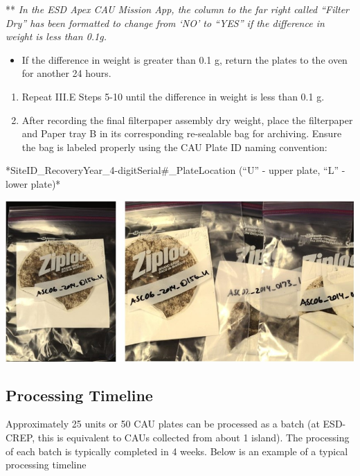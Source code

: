 \documentclass[]{book}
\providecommand{\tightlist}{%
  \setlength{\itemsep}{0pt}\setlength{\parskip}{0pt}}
\begin{document}
** \emph{In the ESD Apex CAU Mission App, the column to the far right called ``Filter Dry'' has been formatted to change from `NO' to ``YES'' if the difference in weight is less than 0.1g.}

\begin{itemize}
\tightlist
\item
  If the difference in weight is greater than 0.1 g, return the plates to the oven for another 24 hours.
\end{itemize}

\begin{enumerate}
\def\labelenumi{\arabic{enumi}.}
\setcounter{enumi}{10}
\item
  Repeat III.E Steps 5-10 until the difference in weight is less than 0.1 g.
\item
  After recording the final filterpaper assembly dry weight, place the filterpaper and Paper tray B in its corresponding re-sealable bag for archiving. Ensure the bag is labeled properly using the CAU Plate ID naming convention:
\end{enumerate}

*SiteID\_RecoveryYear\_4-digitSerial\#\_PlateLocation (``U'' - upper plate, ``L'' - lower plate)*

\includegraphics{images/CAU_bag.jpg}

\hypertarget{processing-timeline}{%
\subsection{Processing Timeline}\label{processing-timeline}}

Approximately 25 units or 50 CAU plates can be processed as a batch (at ESD-CREP, this is equivalent to CAUs collected from about 1 island). The processing of each batch is typically completed in 4 weeks. Below is an example of a typical processing timeline
\end{document}
